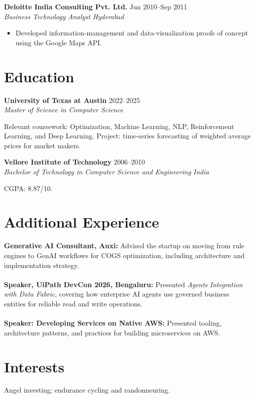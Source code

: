 \documentclass[11pt,a4paper]{article}
\newcommand{\resumeRole}[4]{
  \textbf{#1} \hfill #2\\
  \textit{#3} \hfill \textit{#4}
}
\begin{document}
\resumeRole{Deloitte India Consulting Pvt. Ltd.}{Jun 2010--Sep 2011}{Business Technology Analyst}{Hyderabad}
\begin{itemize}
    \item Developed information-management and data-visualization proofs of concept using the Google Maps API.
\end{itemize}

\section{Education}

\resumeRole{University of Texas at Austin}{2022--2025}{Master of Science in Computer Science}{}
Relevant coursework: Optimization, Machine Learning, NLP, Reinforcement Learning, and Deep Learning. Project: time-series forecasting of weighted average prices for market makers.

\resumeRole{Vellore Institute of Technology}{2006--2010}{Bachelor of Technology in Computer Science and Engineering}{India}
CGPA: 8.87/10.

\section{Additional Experience}

\textbf{Generative AI Consultant, Auxi:} Advised the startup on moving from rule engines to GenAI workflows for COGS optimization, including architecture and implementation strategy.\\\\
\textbf{Speaker, UiPath DevCon 2026, Bengaluru:} Presented \textit{Agents Integration with Data Fabric}, covering how enterprise AI agents use governed business entities for reliable read and write operations.\\\\
\textbf{Speaker: Developing Services on Native AWS:} Presented tooling, architecture patterns, and practices for building microservices on AWS.

\section{Interests}
Angel investing; endurance cycling and randonneuring.
\end{document}

